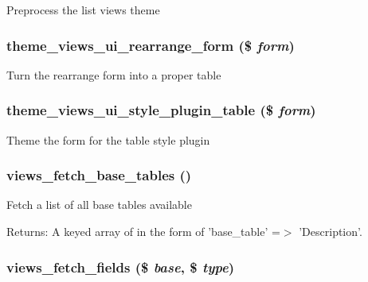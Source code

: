 Preprocess the list views theme \hypertarget{admin_8inc_45a823b50e25c9050b2d28a5eb53c023}{
\subsubsection[{theme\_\-views\_\-ui\_\-rearrange\_\-form}]{\setlength{\rightskip}{0pt plus 5cm}theme\_\-views\_\-ui\_\-rearrange\_\-form (\$ {\em form})}}
\label{admin_8inc_45a823b50e25c9050b2d28a5eb53c023}


Turn the rearrange form into a proper table \hypertarget{admin_8inc_ca470c026194aeade2469d96c661fb8e}{
\subsubsection[{theme\_\-views\_\-ui\_\-style\_\-plugin\_\-table}]{\setlength{\rightskip}{0pt plus 5cm}theme\_\-views\_\-ui\_\-style\_\-plugin\_\-table (\$ {\em form})}}
\label{admin_8inc_ca470c026194aeade2469d96c661fb8e}


Theme the form for the table style plugin \hypertarget{admin_8inc_36ed4b1513b45a8a358d2cb3fb287d06}{
\subsubsection[{views\_\-fetch\_\-base\_\-tables}]{\setlength{\rightskip}{0pt plus 5cm}views\_\-fetch\_\-base\_\-tables ()}}
\label{admin_8inc_36ed4b1513b45a8a358d2cb3fb287d06}


Fetch a list of all base tables available

\begin{Desc}
\item[Returns:]A keyed array of in the form of 'base\_\-table' =$>$ 'Description'. \end{Desc}
\hypertarget{admin_8inc_cfe593e87bda99fc3263579ba22cb9a8}{
\subsubsection[{views\_\-fetch\_\-fields}]{\setlength{\rightskip}{0pt plus 5cm}views\_\-fetch\_\-fields (\$ {\em base}, \/  \$ {\em type})}}
\label{admin_8inc_cfe593e87bda99fc3263579ba22cb9a8}


